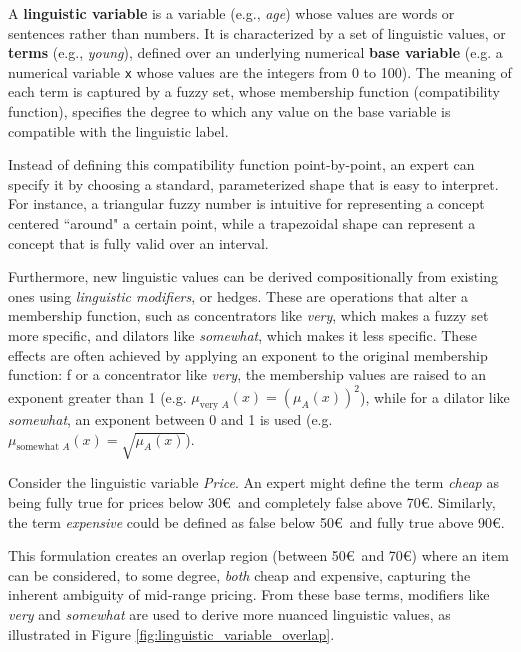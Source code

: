\begin{definition}
A \textbf{linguistic variable} is a variable (e.g., \emph{age}) whose values are words or sentences rather than numbers. It is characterized by a set of linguistic values, or \textbf{terms} (e.g., \emph{young}), defined over an underlying numerical \textbf{base variable} (e.g. a numerical variable \texttt{x} whose values are the integers from 0 to 100). The meaning of each term is captured by a fuzzy set, whose membership function (compatibility function), specifies the degree to which any value on the base variable is compatible with the linguistic label.
\end{definition}

Instead of defining this compatibility function point-by-point, an expert can specify it by choosing a standard, parameterized shape that is easy to interpret. For instance, a triangular fuzzy number is intuitive for representing a concept centered ``around" a certain point, while a trapezoidal shape can represent a concept that is fully valid over an interval. 

Furthermore, new linguistic values can be derived compositionally from existing ones using \emph{linguistic modifiers}, or hedges. These are operations that alter a membership function, such as concentrators like \emph{very}, which makes a fuzzy set more specific, and dilators like \emph{somewhat}, which makes it less specific. These effects are often achieved by applying an exponent to the original membership function: f
or a concentrator like \emph{very}, the membership values are raised to an exponent greater than 1 (e.g. $\mu_{\text{very } A}(x) = (\mu_A(x))^2$), while for a dilator like \emph{somewhat}, an exponent between 0 and 1 is used (e.g. $\mu_{\text{somewhat } A}(x) = \sqrt{\mu_A(x)}$).

\begin{example}
    Consider the linguistic variable \emph{Price}. An expert might define the term \emph{cheap} as being fully true for prices below 30\euro$\,$ and completely false above 70\euro. Similarly, the term \emph{expensive} could be defined as false below 50\euro$\,$ and fully true above 90\euro. 
    
    This formulation creates an overlap region (between 50\euro$\,$ and 70\euro) where an item can be considered, to some degree, \emph{both} cheap and expensive, capturing the inherent ambiguity of mid-range pricing. From these base terms, modifiers like \emph{very} and \emph{somewhat} are used to derive more nuanced linguistic values, as illustrated in Figure \ref{fig:linguistic_variable_overlap}.
\end{example}

